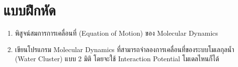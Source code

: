 \section{แบบฝึกหัด}

\begin{enumerate}[topsep=0pt,noitemsep]
  \setlength\itemsep{0.5em}
  \item พิสูจน์สมการการเคลื่อนที่ (Equation of Motion) ของ Molecular Dynamics

  \item เขียนโปรแกรม Molecular Dynamics ที่สามารถจำลองการเคลื่อนที่ของระบบโมเลกุลน้ำ (Water Cluster) แบบ 2 มิติ โดยจะใช้ Interaction Potential โมเดลไหนก็ได้
\end{enumerate}
